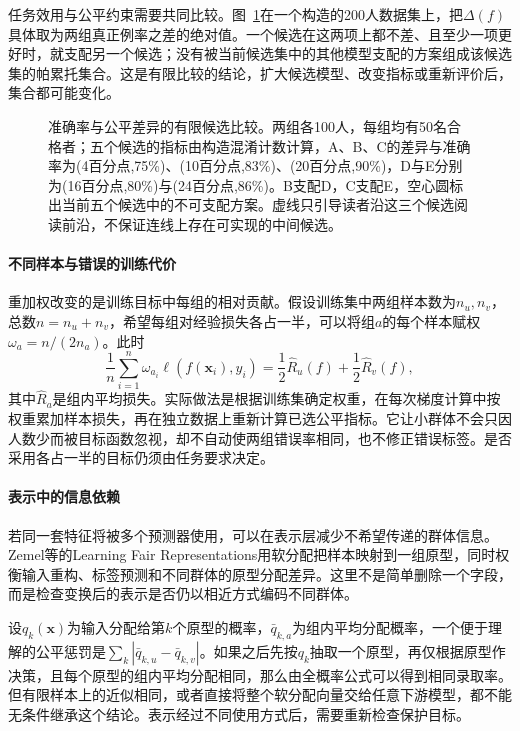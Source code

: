 任务效用与公平约束需要共同比较。图~\ref{fig:trust-fairness-pareto}在一个构造的200人数据集上，把$\Delta(f)$具体取为两组真正例率之差的绝对值。一个候选在这两项上都不差、且至少一项更好时，就支配另一个候选；没有被当前候选集中的其他模型支配的方案组成该候选集的帕累托集合。这是有限比较的结论，扩大候选模型、改变指标或重新评价后，集合都可能变化。

\begin{figure}[htbp]
  \centering
  
  \caption{准确率与公平差异的有限候选比较。两组各100人，每组均有50名合格者；五个候选的指标由构造混淆计数计算，A、B、C的差异与准确率为(4百分点,75\%)、(10百分点,83\%)、(20百分点,90\%)，D与E分别为(16百分点,80\%)与(24百分点,86\%)。B支配D，C支配E，空心圆标出当前五个候选中的不可支配方案。虚线只引导读者沿这三个候选阅读前沿，不保证连线上存在可实现的中间候选。}
  \label{fig:trust-fairness-pareto}
\end{figure}

\paragraph{不同样本与错误的训练代价}

重加权改变的是训练目标中每组的相对贡献。假设训练集中两组样本数为$n_u,n_v$，总数$n=n_u+n_v$，希望每组对经验损失各占一半，可以将组$a$的每个样本赋权$\omega_a=n/(2n_a)$。此时
\[
 \frac1n\sum_{i=1}^{n}\omega_{a_i}\ell(f(\bm x_i),y_i)
 =\frac12\hat R_u(f)+\frac12\hat R_v(f),
\]
其中$\hat R_a$是组内平均损失。实际做法是根据训练集确定权重，在每次梯度计算中按权重累加样本损失，再在独立数据上重新计算已选公平指标。它让小群体不会只因人数少而被目标函数忽视，却不自动使两组错误率相同，也不修正错误标签。是否采用各占一半的目标仍须由任务要求决定。

\paragraph{表示中的信息依赖}

若同一套特征将被多个预测器使用，可以在表示层减少不希望传递的群体信息。Zemel等的Learning Fair Representations用软分配把样本映射到一组原型，同时权衡输入重构、标签预测和不同群体的原型分配差异。这里不是简单删除一个字段，而是检查变换后的表示是否仍以相近方式编码不同群体。

设$q_k(\bm{x})$为输入分配给第$k$个原型的概率，$\bar q_{k,a}$为组内平均分配概率，一个便于理解的公平惩罚是$\sum_k|\bar q_{k,u}-\bar q_{k,v}|$。如果之后先按$q_k$抽取一个原型，再仅根据原型作决策，且每个原型的组内平均分配相同，那么由全概率公式可以得到相同录取率。但有限样本上的近似相同，或者直接将整个软分配向量交给任意下游模型，都不能无条件继承这个结论。表示经过不同使用方式后，需要重新检查保护目标。


